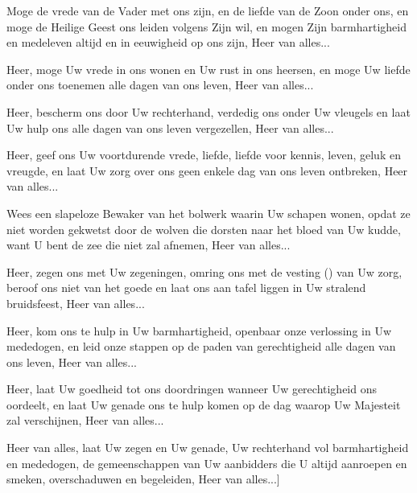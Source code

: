 \documentclass[12pt,twoside,a5paper]{article}
\begin{document}
\begin{halfparskip}
   Moge de vrede van de Vader met ons zijn, en de liefde van de Zoon onder ons, en moge de Heilige Geest ons leiden volgens Zijn wil, en mogen Zijn barmhartigheid en medeleven altijd en in eeuwigheid op ons zijn, Heer van alles...

   Heer, moge Uw vrede in ons wonen en Uw rust in ons heersen, en moge Uw liefde onder ons toenemen alle dagen van ons leven, Heer van alles...

   Heer, bescherm ons door Uw rechterhand, verdedig ons onder Uw vleugels en laat Uw hulp ons alle dagen van ons leven vergezellen, Heer van alles...

   Heer, geef ons Uw voortdurende vrede, liefde, liefde voor kennis, leven, geluk en vreugde, en laat Uw zorg over ons geen enkele dag van ons leven ontbreken, Heer van alles...

   Wees een slapeloze Bewaker van het bolwerk waarin Uw schapen wonen, opdat ze niet worden gekwetst door de wolven die dorsten naar het bloed van Uw kudde, want U bent de zee die niet zal afnemen, Heer van alles...

   Heer, zegen ons met Uw zegeningen, omring ons met de vesting () van Uw zorg, beroof ons niet van het goede en laat ons aan tafel liggen in Uw stralend bruidsfeest, Heer van alles...

   Heer, kom ons te hulp in Uw barmhartigheid, openbaar onze verlossing in Uw mededogen, en leid onze stappen op de paden van gerechtigheid alle dagen van ons leven, Heer van alles...

   Heer, laat Uw goedheid tot ons doordringen wanneer Uw gerechtigheid ons oordeelt, en laat Uw genade ons te hulp komen op de dag waarop Uw Majesteit zal verschijnen, Heer van alles...

   Heer van alles, laat Uw zegen en Uw genade, Uw rechterhand vol barmhartigheid en mededogen, de gemeenschappen van Uw aanbidders die U altijd aanroepen en smeken, overschaduwen en begeleiden, Heer van alles...]
\end{halfparskip}


\end{document}

